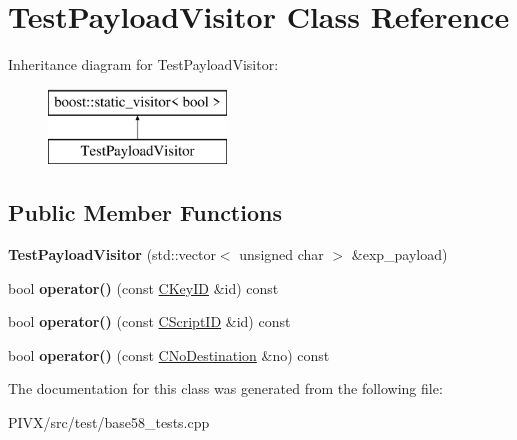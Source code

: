 \hypertarget{class_test_payload_visitor}{}\section{Test\+Payload\+Visitor Class Reference}
\label{class_test_payload_visitor}
Inheritance diagram for Test\+Payload\+Visitor\+:\begin{figure}[H]
\begin{center}
\leavevmode
\includegraphics[height=2.000000cm]{class_test_payload_visitor}
\end{center}
\end{figure}
\subsection*{Public Member Functions}
\begin{DoxyCompactItemize}
\item 
\mbox{\label{class_test_payload_visitor_a8f963dfce22edb3c83c5712f4a9fa64d}} 
{\bfseries Test\+Payload\+Visitor} (std\+::vector$<$ unsigned char $>$ \&exp\+\_\+payload)
\item 
\mbox{\label{class_test_payload_visitor_a93c64602e0082662a5d03e4d7979b7e9}} 
bool {\bfseries operator()} (const \mbox{\hyperlink{class_c_key_i_d}{C\+Key\+ID}} \&id) const
\item 
\mbox{\label{class_test_payload_visitor_af0ba08e8ebf99e1997488e28463ee943}} 
bool {\bfseries operator()} (const \mbox{\hyperlink{class_c_script_i_d}{C\+Script\+ID}} \&id) const
\item 
\mbox{\label{class_test_payload_visitor_af0ed2b2fd03f94c8009713aabd0a8191}} 
bool {\bfseries operator()} (const \mbox{\hyperlink{class_c_no_destination}{C\+No\+Destination}} \&no) const
\end{DoxyCompactItemize}


The documentation for this class was generated from the following file\+:\begin{DoxyCompactItemize}
\item 
P\+I\+V\+X/src/test/base58\+\_\+tests.\+cpp\end{DoxyCompactItemize}
